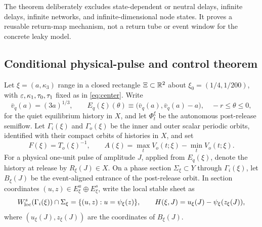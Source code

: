 The theorem deliberately excludes state-dependent or neutral delays,
infinite delays, infinite networks, and infinite-dimensional node states.
It proves a reusable return-map mechanism, not a return tube or event window
for the concrete leaky model.

\subsection{Conditional physical-pulse and control theorem}

Let \(\xi=(a,\kappa_3)\) range in a closed rectangle
\(\Xi\subset\mathbb R^2\) about
\(\xi_0=(1/4,1/200)\), with \(\varepsilon,\kappa_1,\tau_0,\tau_1\) fixed as in
\cref{eq:center}.  Write
\begin{equation}
 \bar v_q(a)=(3a)^{1/3},\qquad
 E_q(\xi)(\theta)\equiv
 \bigl(\bar v_q(a),\bar v_q(a)-a\bigr),
 \quad -r\le\theta\le0,                               \label{eq:quiet-equilibrium}
\end{equation}
for the quiet equilibrium history in \(X\), and let
\(\Phi_t^\xi\) be the autonomous post-release semiflow.  Let
\(\Gamma_i(\xi)\) and \(\Gamma_o(\xi)\) be the inner and outer scalar
periodic orbits, identified with their compact orbits of histories in
\(X\), and set
\begin{equation}
 F(\xi)=T_o(\xi)^{-1},\qquad
 A(\xi)=\max_tV_o(t;\xi)-\min_tV_o(t;\xi).             \label{eq:outer-observables}
\end{equation}
For a physical one-unit pulse of amplitude \(J\), applied from
\(E_q(\xi)\), denote the history at release by \(R_\xi(J)\in X\).  On a
phase section \(\Sigma_\xi\subset Y\) through
\(\Gamma_i(\xi)\), let \(B_\xi(J)\) be the event-aligned entrance of the
post-release orbit.  In section coordinates
\((u,z)\in E^u_\xi\oplus E^s_\xi\), write the local stable sheet as
\begin{equation}
 W^s_{\rm loc}(\Gamma_i(\xi))\cap\Sigma_\xi
   =\{(u,z):u=\psi_\xi(z)\},
 \qquad H(\xi,J)=u_\xi(J)-\psi_\xi(z_\xi(J)),          \label{eq:pulse-gap}
\end{equation}
where \((u_\xi(J),z_\xi(J))\) are the coordinates of \(B_\xi(J)\).

